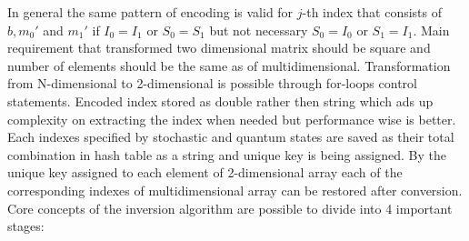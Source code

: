 In general the same pattern of encoding is valid for $j$-th index that consists of $b,m_0'$ and $m_1'$ if $I_0=I_1$ or $S_0=S_1$ but not necessary $S_0=I_0$ or $S_1=I_1$. Main requirement that transformed two dimensional matrix should be square and number of elements should be the same as of multidimensional. Transformation from N-dimensional to 2-dimensional is possible through for-loops control statements. Encoded index stored as double rather then string which ads up complexity on extracting the index when needed but performance wise is better. Each indexes specified by stochastic and quantum states are saved as their total combination in hash table as a string and unique key is being assigned. By the unique key assigned to each element of 2-dimensional array each of the corresponding indexes of multidimensional array can be restored after conversion. Core concepts of the inversion algorithm are possible to divide into 4 important stages:  

